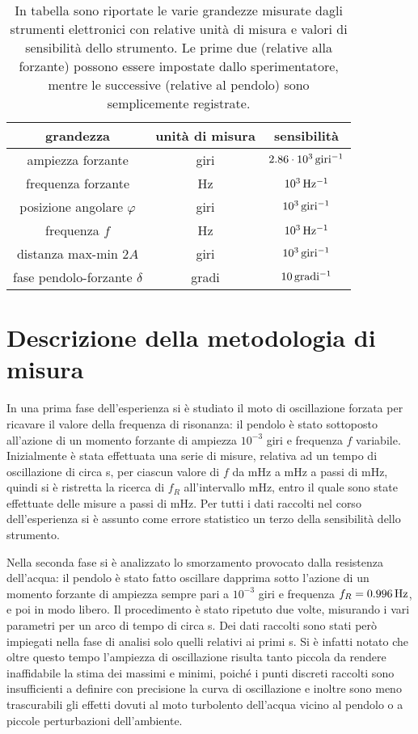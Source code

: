 \documentclass[italian,a4paper]{article}
\begin{document}
\begin{table}[!h]\caption{In tabella sono riportate le varie grandezze misurate dagli strumenti elettronici con relative unità di misura e valori di sensibilità dello strumento. Le prime due (relative alla forzante) possono essere impostate dallo sperimentatore, mentre le successive (relative al pendolo) sono semplicemente registrate.}
\centering
\begin{tabular}{ccc}
grandezza	&unità di misura&		sensibilità\\\hline
ampiezza forzante&	giri&			$\unit[2.86\cdot10^3]{giri^{-1}}$\\
frequenza forzante&	Hz&			$\unit[10^3]{Hz^{-1}}$\\
posizione angolare $\varphi$&	giri&		$\unit[10^3]{giri^{-1}}$\\
frequenza $f$&			Hz&		$\unit[10^3]{Hz^{-1}}$\\
distanza max-min $2A$&	giri&		$\unit[10^3]{giri^{-1}}$\\
fase pendolo-forzante $\delta$&		gradi&	$\unit[10]{gradi^{-1}}$
\end{tabular}
\end{table}

\section{Descrizione della metodologia di misura}
In una prima fase dell'esperienza si è studiato il moto di oscillazione forzata per ricavare il valore della frequenza di risonanza: il pendolo è stato sottoposto all'azione di un momento forzante di ampiezza $10^{-3}$ giri e frequenza $f$ variabile. Inizialmente è stata effettuata una serie di misure, relativa ad un tempo di oscillazione di circa \unit[30]{s}, per ciascun valore di $f$  da \unit[900]{mHz} a \unit[1000]{mHz} a passi di \unit[10]{mHz}, quindi si è ristretta la ricerca di $f_R$ all'intervallo \unit[960-970]{mHz}, entro il quale sono state effettuate delle misure a passi di \unit[1]{mHz}. Per tutti i dati raccolti nel corso dell'esperienza si è assunto come errore statistico un terzo della sensibilità dello strumento.

Nella seconda fase si è analizzato lo smorzamento provocato dalla resistenza dell'acqua: il pendolo è stato fatto oscillare dapprima sotto l'azione di un momento forzante di ampiezza sempre pari a $10^{-3}$ giri e frequenza $f_R = \unit[0.996]{Hz}$, e poi in modo libero. Il procedimento è stato ripetuto due volte, misurando i vari parametri per un arco di tempo di circa \unit[90]{s}. Dei dati raccolti sono stati però impiegati nella fase di analisi solo quelli relativi ai primi \unit[40]{s}. Si è infatti notato che oltre questo tempo l'ampiezza di oscillazione risulta tanto piccola da rendere inaffidabile la stima dei massimi e minimi, poiché i punti discreti raccolti sono insufficienti a definire con precisione la curva di oscillazione e inoltre sono meno trascurabili gli effetti dovuti al moto turbolento dell'acqua vicino al pendolo o a piccole perturbazioni dell'ambiente.
\end{document}
